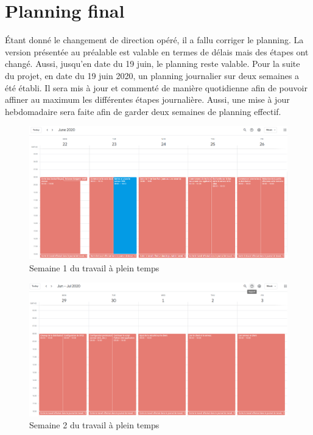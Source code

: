 \chapter{Planning final}
\label{ch:final}

Étant donné le changement de direction opéré, il a fallu corriger le planning.
La version présentée au préalable est valable en termes de délais mais des étapes ont changé.
Aussi, jusqu'en date du 19 juin, le planning reste valable.
Pour la suite du projet, en date du 19 juin 2020, un planning journalier sur deux semaines a été établi.
Il sera mis à jour et commenté de manière quotidienne afin de pouvoir affiner au maximum les différentes étapes journalière.
Aussi, une mise à jour hebdomadaire sera faite afin de garder deux semaines de planning effectif.
\newline

\begin{figure}[H]
	\centering
	\includegraphics[scale=0.25]{images/planning/week1.png}
	\caption{Semaine 1 du travail à plein temps}
	\label{fig:week1}
\end{figure}


\begin{figure}[H]
	\centering
	\includegraphics[scale=0.25]{images/planning/week2.png}
	\caption{Semaine 2 du travail à plein temps}
	\label{fig:week2}
\end{figure}


